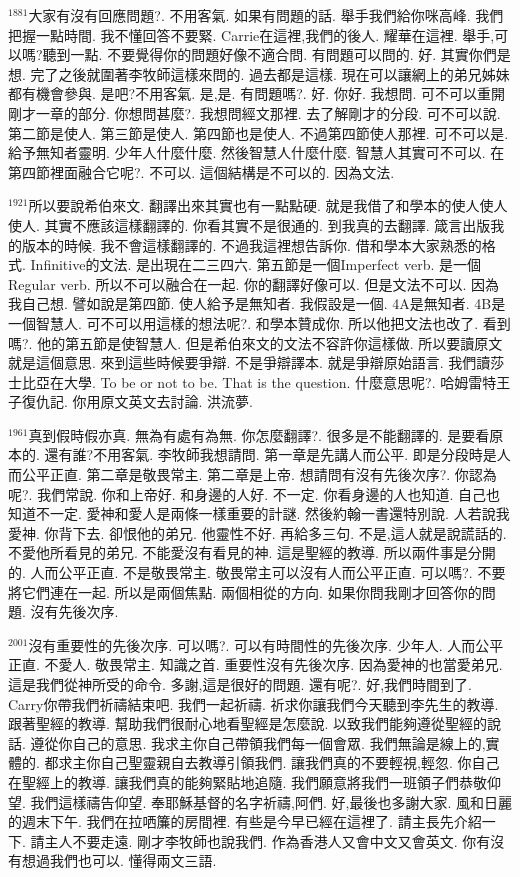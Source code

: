 \documentclass{book}
\begin{document}
$^{1881}$大家有沒有回應問題?.
不用客氣.
如果有問題的話.
舉手我們給你咪高峰.
我們把握一點時間.
我不懂回答不要緊.
Carrie在這裡,我們的後人.
耀華在這裡.
舉手,可以嗎?聽到一點.
不要覺得你的問題好像不適合問.
有問題可以問的.
好.
其實你們是想.
完了之後就圍著李牧師這樣來問的.
過去都是這樣.
現在可以讓網上的弟兄姊妹都有機會參與.
是吧?不用客氣.
是,是.
有問題嗎?.
好.
你好.
我想問.
可不可以重開剛才一章的部分.
你想問甚麼?.
我想問經文那裡.
去了解剛才的分段.
可不可以說.
第二節是使人.
第三節是使人.
第四節也是使人.
不過第四節使人那裡.
可不可以是.
給予無知者靈明.
少年人什麼什麼.
然後智慧人什麼什麼.
智慧人其實可不可以.
在第四節裡面融合它呢?.
不可以.
這個結構是不可以的.
因為文法.

$^{1921}$所以要說希伯來文.
翻譯出來其實也有一點點硬.
就是我借了和學本的使人使人使人.
其實不應該這樣翻譯的.
你看其實不是很通的.
到我真的去翻譯.
箴言出版我的版本的時候.
我不會這樣翻譯的.
不過我這裡想告訴你.
借和學本大家熟悉的格式.
Infinitive的文法.
是出現在二三四六.
第五節是一個Imperfect verb.
是一個Regular verb.
所以不可以融合在一起.
你的翻譯好像可以.
但是文法不可以.
因為我自己想.
譬如說是第四節.
使人給予是無知者.
我假設是一個.
4A是無知者.
4B是一個智慧人.
可不可以用這樣的想法呢?.
和學本贊成你.
所以他把文法也改了.
看到嗎?.
他的第五節是使智慧人.
但是希伯來文的文法不容許你這樣做.
所以要讀原文就是這個意思.
來到這些時候要爭辯.
不是爭辯譯本.
就是爭辯原始語言.
我們讀莎士比亞在大學.
To be or not to be.
That is the question.
什麼意思呢?.
哈姆雷特王子復仇記.
你用原文英文去討論.
洪流夢.

$^{1961}$真到假時假亦真.
無為有處有為無.
你怎麼翻譯?.
很多是不能翻譯的.
是要看原本的.
還有誰?不用客氣.
李牧師我想請問.
第一章是先講人而公平.
即是分段時是人而公平正直.
第二章是敬畏常主.
第二章是上帝.
想請問有沒有先後次序?.
你認為呢?.
我們常說.
你和上帝好.
和身邊的人好.
不一定.
你看身邊的人也知道.
自己也知道不一定.
愛神和愛人是兩條一樣重要的計謎.
然後約翰一書還特別說.
人若說我愛神.
你背下去.
卻恨他的弟兄.
他靈性不好.
再給多三句.
不是,這人就是說謊話的.
不愛他所看見的弟兄.
不能愛沒有看見的神.
這是聖經的教導.
所以兩件事是分開的.
人而公平正直.
不是敬畏常主.
敬畏常主可以沒有人而公平正直.
可以嗎?.
不要將它們連在一起.
所以是兩個焦點.
兩個相從的方向.
如果你問我剛才回答你的問題.
沒有先後次序.

$^{2001}$沒有重要性的先後次序.
可以嗎?.
可以有時間性的先後次序.
少年人.
人而公平正直.
不愛人.
敬畏常主.
知識之首.
重要性沒有先後次序.
因為愛神的也當愛弟兄.
這是我們從神所受的命令.
多謝,這是很好的問題.
還有呢?.
好,我們時間到了.
Carry你帶我們祈禱結束吧.
我們一起祈禱.
祈求你讓我們今天聽到李先生的教導.
跟著聖經的教導.
幫助我們很耐心地看聖經是怎麼說.
以致我們能夠遵從聖經的說話.
遵從你自己的意思.
我求主你自己帶領我們每一個會眾.
我們無論是線上的,實體的.
都求主你自己聖靈親自去教導引領我們.
讓我們真的不要輕視,輕忽.
你自己在聖經上的教導.
讓我們真的能夠緊貼地追隨.
我們願意將我們一班領子們恭敬仰望.
我們這樣禱告仰望.
奉耶穌基督的名字祈禱,阿們.
好,最後也多謝大家.
風和日麗的週末下午.
我們在拉哂簾的房間裡.
有些是今早已經在這裡了.
請主長先介紹一下.
請主人不要走遠.
剛才李牧師也說我們.
作為香港人又會中文又會英文.
你有沒有想過我們也可以.
懂得兩文三語.
\end{document}
